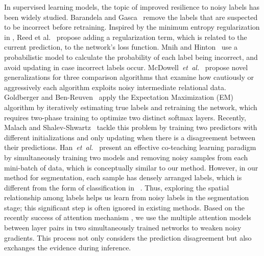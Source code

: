 \documentclass[letterpaper]{article} %
\begin{document}
In supervised learning models, the topic of improved resilience to noisy labels has been widely studied. 
Barandela and Gasca~ remove the labels that are suspected to be incorrect before retraining.
Inspired by the minimum entropy regularization in \cite{Grandvalet2005}, Reed et al.~ propose adding a regularization term, which is related to the current prediction, to the network's loss function.
Mnih and Hinton~ use a probabilistic model to calculate the probability of each label being incorrect, and avoid updating in case incorrect labels occur.
McDowell~\emph{et~al.}~ propose novel generalizations for three comparison algorithms that examine how cautiously or aggressively each algorithm exploits noisy intermediate relational data.
Goldberger and Ben-Reuven~ apply the Expectation Maximization (EM) algorithm by iteratively estimating true labels and retraining the network, which requires two-phase training to optimize two distinct softmax layers.
Recently, Malach and Shalev-Shwartz~ tackle this problem by training two predictors with different initializations and only updating when there is a disagreement between their predictions.
Han~\emph{et~al.}~ present an effective co-teaching learning paradigm by simultaneously training two models and removing noisy samples from each mini-batch of data, which is conceptually similar to our method.
However, in our method for segmentation, each sample has densely arranged labels, which is different from the form of classification in ~\cite{Han2018}.
Thus, exploring the spatial relationship among labels helps us learn from noisy labels in the segmentation stage; this significant step is often ignored in existing methods.
Based on the recently success of attention mechanism \cite{he2018twofold,DBLP:conf/bmvc/YueMWZZ018,8237486,chen2018temporal}, we use the multiple attention models between layer pairs in two simultaneously trained networks to weaken noisy gradients. This process not only considers the prediction disagreement but also exchanges the evidence during inference.
\end{document}
